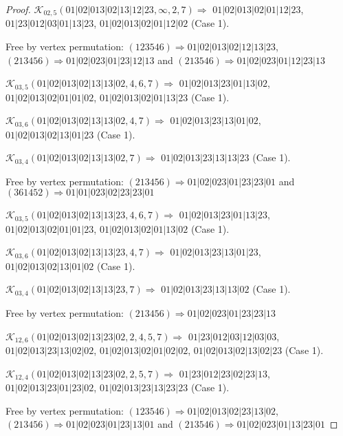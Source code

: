 \documentclass[12pt]{article}
\theoremstyle{plain}
\theoremstyle{definition}
\theoremstyle{remark}
\newcommand{\fancy}[1]{\mathcal{#1}}
\def\K{\fancy{K}}
\begin{document}
\begin{proof}
	$\K_{02,5}(01|02|013|02|13|12|23,\infty,2, 7)\Rightarrow $ $01|02|013|02|01|12|23$, $01|23|012|03|01|13|23$, $01|02|013|02|01|12|02$ (Case 1).
	
	
	
	Free by vertex permutation: $(1 2 3 5 4 6)\Rightarrow 01|02|013|02|12|13|23$, $(2 1 3 4 5 6)\Rightarrow 01|02|023|01|23|12|13$ and $(2 1 3 5 4 6)\Rightarrow 01|02|023|01|12|23|13$
	
	
	
	\bigskip
	
	$\K_{03,5}(01|02|013|02|13|13|02,4, 6, 7)\Rightarrow $ $01|02|013|23|01|13|02$, $01|02|013|02|01|01|02$, $01|02|013|02|01|13|23$ (Case 1).
	
	$\K_{03,6}(01|02|013|02|13|13|02,4, 7)\Rightarrow $ $01|02|013|23|13|01|02$, $01|02|013|02|13|01|23$ (Case 1).
	
	$\K_{03,4}(01|02|013|02|13|13|02,7)\Rightarrow $ $01|02|013|23|13|13|23$ (Case 1).
	
	
	
	Free by vertex permutation: $(2 1 3 4 5 6)\Rightarrow 01|02|023|01|23|23|01$ and $(3 6 1 4 5 2)\Rightarrow 01|01|023|02|23|23|01$
	
	
	
	\bigskip
	
	$\K_{03,5}(01|02|013|02|13|13|23,4, 6, 7)\Rightarrow $ $01|02|013|23|01|13|23$, $01|02|013|02|01|01|23$, $01|02|013|02|01|13|02$ (Case 1).
	
	$\K_{03,6}(01|02|013|02|13|13|23,4, 7)\Rightarrow $ $01|02|013|23|13|01|23$, $01|02|013|02|13|01|02$ (Case 1).
	
	$\K_{03,4}(01|02|013|02|13|13|23,7)\Rightarrow $ $01|02|013|23|13|13|02$ (Case 1).
	
	
	
	Free by vertex permutation: $(2 1 3 4 5 6)\Rightarrow 01|02|023|01|23|23|13$
	
	
	
	\bigskip
	
	$\K_{12,6}(01|02|013|02|13|23|02,2, 4, 5, 7)\Rightarrow $ $01|23|012|03|12|03|03$, $01|02|013|23|13|02|02$, $01|02|013|02|01|02|02$, $01|02|013|02|13|02|23$ (Case 1).
	
	$\K_{12,4}(01|02|013|02|13|23|02,2, 5, 7)\Rightarrow $ $01|23|012|23|02|23|13$, $01|02|013|23|01|23|02$, $01|02|013|23|13|23|23$ (Case 1).
	
	
	
	Free by vertex permutation: $(1 2 3 5 4 6)\Rightarrow 01|02|013|02|23|13|02$, $(2 1 3 4 5 6)\Rightarrow 01|02|023|01|23|13|01$ and $(2 1 3 5 4 6)\Rightarrow 01|02|023|01|13|23|01$
	

\end{proof}
\end{document}
